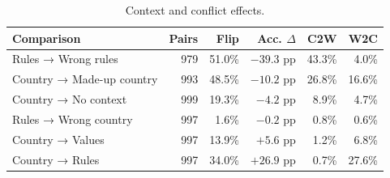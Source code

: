\begin{table}[t]
\centering\footnotesize
\setlength{\tabcolsep}{4.5pt}
\begin{tabularx}{\textwidth}{Xrrrrr}
\toprule
Comparison & Pairs & Flip & Acc. $\Delta$ & C2W & W2C \\
\midrule
Rules → Wrong rules & 979 & 51.0\% & $-39.3$ pp & 43.3\% & 4.0\% \\
Country → Made-up country & 993 & 48.5\% & $-10.2$ pp & 26.8\% & 16.6\% \\
Country → No context & 999 & 19.3\% & $-4.2$ pp & 8.9\% & 4.7\% \\
Rules → Wrong country & 997 & 1.6\% & $-0.2$ pp & 0.8\% & 0.6\% \\
Country → Values & 997 & 13.9\% & $+5.6$ pp & 1.2\% & 6.8\% \\
Country → Rules & 997 & 34.0\% & $+26.9$ pp & 0.7\% & 27.6\% \\
\bottomrule
\end{tabularx}
\caption{Context and conflict effects.}
\label{tab:context-conflict}
\end{table}
